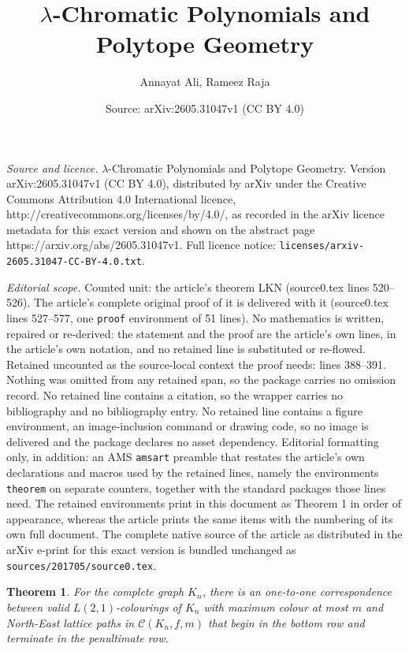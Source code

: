 \documentclass[10pt,a4paper]{amsart}
\title{$\lambda$-Chromatic Polynomials and Polytope Geometry}
\author{Annayat Ali, Rameez Raja}
\date{Source: arXiv:2605.31047v1 (CC BY 4.0)}
\newtheorem{theorem}{Theorem}
\begin{document}
\maketitle

\noindent\emph{Source and licence.} $\lambda$-Chromatic Polynomials and Polytope Geometry. Version arXiv:2605.31047v1 (CC BY 4.0), distributed by arXiv under the Creative Commons Attribution 4.0 International licence, http://creativecommons.org/licenses/by/4.0/, as recorded in the arXiv licence metadata for this exact version and shown on the abstract page https://arxiv.org/abs/2605.31047v1. Full licence notice: \texttt{licenses/arxiv-2605.31047-CC-BY-4.0.txt}.\par\smallskip

\noindent\textit{Editorial scope.} Counted unit: the article's theorem LKN (source0.tex lines 520--526). The article's complete original proof of it is delivered with it (source0.tex lines 527--577, one \texttt{proof} environment of 51 lines). No mathematics is written, repaired or re-derived: the statement and the proof are the article's own lines, in the article's own notation, and no retained line is substituted or re-flowed.  Retained uncounted as the source-local context the proof needs: lines 388--391.  Nothing was omitted from any retained span, so the package carries no omission record.  No retained line contains a citation, so the wrapper carries no bibliography and no bibliography entry.  No retained line contains a figure environment, an image-inclusion command or drawing code, so no image is delivered and the package declares no asset dependency.  Editorial formatting only, in addition: an AMS \texttt{amsart} preamble that restates the article's own declarations and macros used by the retained lines, namely the environments \texttt{theorem} on separate counters, together with the standard packages those lines need.  The retained environments print in this document as Theorem 1 in order of appearance, whereas the article prints the same items with the numbering of its own full document.  The complete native source of the article as distributed in the arXiv e-print for this exact version is bundled unchanged as \texttt{sources/201705/source0.tex}.
\begin{theorem}
\label{t1}
For the complete graph \( K_n \), there is an one-to-one correspondence between valid \( L(2,1) \)-colourings of \( K_n \) with maximum colour at most \( m \) and North-East lattice paths in \( \mathcal{C}(K_n, f, m) \) that begin in the bottom row and terminate in the penultimate row.
\end{theorem}
\end{document}
